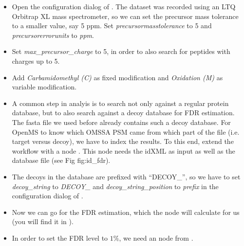 \begin{itemize}
\item
Open the configuration dialog of .
The dataset was recorded using an LTQ Orbitrap XL mass spectrometer, so we can set the precursor mass tolerance to a smaller value, say 5 ppm.
Set \textit{precursor\textunderscore mass\textunderscore tolerance} to 5 and \\ \textit{precursor\textunderscore error\textunderscore units} to \textit{ppm}.
\item
Set \textit{max\_precursor\_charge} to 5, in order to also search for peptides with charges up to 5.
\item
Add \textit{Carbamidomethyl (C)} as fixed modification and \textit{Oxidation (M)} as variable modification.
\item
A common step in analyis is to search not only against a regular protein database, but to also search against a decoy database for FDR estimation.
The fasta file we used before already contains such a decoy database.
For OpenMS to know which OMSSA PSM came from which part of the file (i.e. target versus decoy), we have to index the results.
To this end, extend the workflow with a  node .
This node needs the idXML as input as well as the database file (see Fig fig:id_fdr).
\item
The decoys in the database are prefixed with ``DECOY\_'', so we have to set \textit{decoy\_string} to \textit{DECOY\_} and \textit{decoy\_string\_position} to \textit{prefix} in the configuration dialog of .
\item
Now we can go for the FDR estimation, which the  node will calculate for us (you will find it in ).
\item
In order to set the FDR level to $1\%$, we need an  node from .

\end{itemize}
